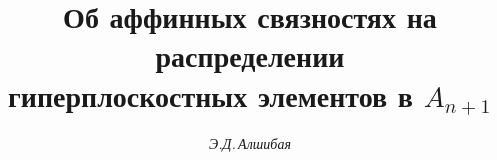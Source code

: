 

 


%  


 


\newcommand{\const}{\operatorname{const}} 


\newcommand{\tts}[1]{} 


 




 


\setcounter{page}{72} 












 


\author{\it Э.Д.\,Алшибая} 




\title{Об аффинных связностях на распределении\\ 


гиперплоскостных элементов в $A_{n+1}$} 


 


\date{} 




\pagestyle{plain} %


 




\maketitle 


